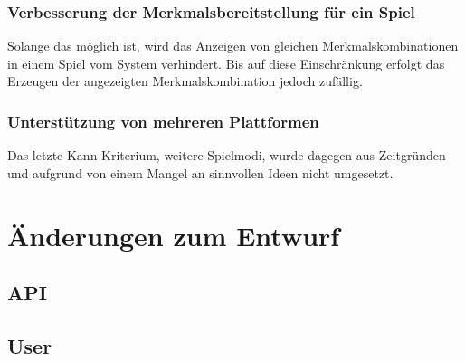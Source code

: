 \documentclass[a4paper]{scrreprt}
\begin{document}
\subsection{Verbesserung der Merkmalsbereitstellung für ein Spiel}
Solange das möglich ist, wird das Anzeigen von gleichen Merkmalskombinationen in einem Spiel vom System verhindert. Bis auf diese Einschränkung erfolgt das Erzeugen der angezeigten Merkmalskombination jedoch zufällig.


\subsection{Unterstützung von mehreren Plattformen}


\hspace{1cm}

Das letzte Kann-Kriterium, weitere Spielmodi, wurde dagegen aus Zeitgründen und aufgrund von einem Mangel an sinnvollen Ideen nicht umgesetzt.

\chapter{Änderungen zum Entwurf}
\section{API}

\section{User}
\end{document}
